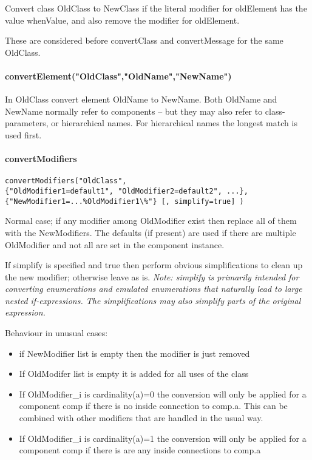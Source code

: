 Convert class OldClass to NewClass if the literal modifier for
oldElement has the value whenValue, and also remove the modifier for
oldElement.

These are considered before convertClass and convertMessage for the same
OldClass.

\paragraph*{convertElement("OldClass","OldName","NewName")}

In OldClass convert element OldName to NewName. Both OldName and NewName
normally refer to components -- but they may also refer to
class-parameters, or hierarchical names. For hierarchical names the
longest match is used first.

\paragraph*{convertModifiers}

\begin{lstlisting}[language=modelica]
convertModifiers("OldClass",
{"OldModifier1=default1", "OldModifier2=default2", ...},
{"NewModifier1=...%OldModifier1\%"} [, simplify=true] )
\end{lstlisting}

Normal case; if any modifier among OldModifier exist then replace all of
them with the NewModifiers. The defaults (if present) are used if there
are multiple OldModifier and not all are set in the component instance.

If simplify is specified and true then perform obvious simplifications
to clean up the new modifier; otherwise leave as is. \emph{Note:
simplify is primarily intended for converting enumerations and emulated
enumerations that naturally lead to large nested if-expressions. The
simplifications may also simplify parts of the original expression.}

Behaviour in unusual cases:

\begin{itemize}
\item
  if NewModifier list is empty then the modifier is just removed
\item
  If OldModifer list is empty it is added for all uses of the class
\item
  If OldModifier\_i is cardinality(a)=0 the conversion will only be
  applied for a component comp if there is no inside connection to
  comp.a. This can be combined with other modifiers that are handled in
  the usual way.
\item
  If OldModifier\_i is cardinality(a)=1 the conversion will only be
  applied for a component comp if there is are any inside connections to
  comp.a
\end{itemize}

